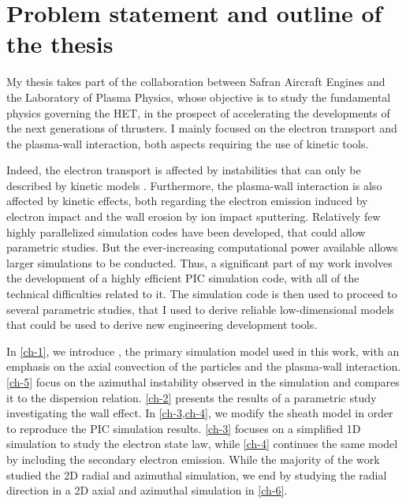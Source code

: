 
\section{Problem statement and outline of the thesis}
\label{sec-problematic}

My thesis takes part of the collaboration between Safran Aircraft Engines and the Laboratory of Plasma Physics, whose objective is to study the fundamental physics governing the \ac{HET}, in the prospect of accelerating the developments of the next generations of thrusters.
I mainly focused on the electron transport and the plasma-wall interaction,
both aspects requiring the use of kinetic tools.

Indeed, the electron transport is affected by instabilities that can only be described by kinetic models \citep{adam2008a,lafleur2016a}.
Furthermore, the plasma-wall interaction is also affected by kinetic effects, both regarding the electron emission induced by electron impact \citep{barral2003a,raitses2011,sydorenko2006} and the wall erosion by ion impact sputtering.
Relatively few highly parallelized simulation codes  have been developed, that could allow parametric studies.
But the ever-increasing computational power available allows larger simulations to be conducted.
Thus, a significant part of my work involves the development of a highly efficient \ac{PIC} simulation code, with all of the technical difficulties related to it.
The simulation code is then used to proceed to several parametric studies, that I used to derive reliable low-dimensional models that could be used to derive new engineering development tools.


\vspace{1em}
In \cref{ch-1}, we introduce \LPPic, the primary simulation model used in this work, with an emphasis on the axial convection of the particles and the plasma-wall interaction.
\cref{ch-5} focus on the azimuthal instability observed in the simulation and compares it to the dispersion relation.
\cref{ch-2} presents the results of a parametric study investigating the wall effect.
In \cref{ch-3,ch-4}, we modify the sheath model in order to reproduce the \ac{PIC} simulation results.
\cref{ch-3} focuses on a simplified \ac{1D} simulation to study the electron state law, while \cref{ch-4} continues the same model by including the secondary electron emission.
While the majority of the work studied the \ac{2D} radial and azimuthal simulation, we end by studying the radial direction in a \ac{2D} axial and azimuthal simulation in \cref{ch-6}.